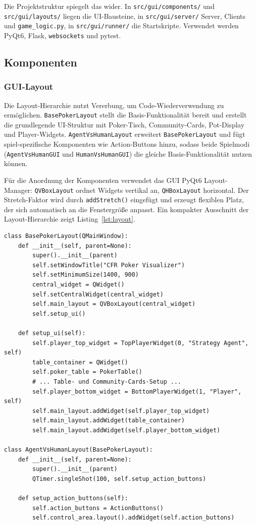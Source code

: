 Die Projektstruktur spiegelt das wider.
In \texttt{src/gui/components/} und \texttt{src/gui/layouts/} liegen die UI-Bausteine, in \texttt{src/gui/server/} Server, Clients und \texttt{game\_logic.py}, in \texttt{src/gui/runner/} die Startskripte.
Verwendet werden PyQt6, Flask, \texttt{websockets} und pytest.

\subsection{Komponenten}

\subsubsection{GUI-Layout}

Die Layout-Hierarchie nutzt Vererbung, um Code-Wiederverwendung zu ermöglichen.
\texttt{BasePokerLayout} stellt die Basis-Funktionalität bereit und erstellt die grundlegende UI-Struktur mit Poker-Tisch, Community-Cards, Pot-Display und Player-Widgets.
\texttt{AgentVsHumanLayout} erweitert \texttt{BasePokerLayout} und fügt spiel-spezifische Komponenten wie Action-Buttons hinzu, sodass beide Spielmodi (\texttt{AgentVsHumanGUI} und \texttt{HumanVsHumanGUI}) die gleiche Basis-Funktionalität nutzen können.

Für die Anordnung der Komponenten verwendet das GUI PyQt6 Layout-Manager: \texttt{QVBoxLayout} ordnet Widgets vertikal an, \texttt{QHBoxLayout} horizontal.
Der Stretch-Faktor wird durch \texttt{addStretch()} eingefügt und erzeugt flexiblen Platz, der sich automatisch an die Fenstergröße anpasst.
Ein kompakter Ausschnitt der Layout-Hierarchie zeigt Listing~\ref{lst:layout}.

\begin{lstlisting}[caption={Layout-Hierarchie (Ausschnitt)}]
class BasePokerLayout(QMainWindow):
    def __init__(self, parent=None):
        super().__init__(parent)
        self.setWindowTitle("CFR Poker Visualizer")
        self.setMinimumSize(1400, 900)
        central_widget = QWidget()
        self.setCentralWidget(central_widget)
        self.main_layout = QVBoxLayout(central_widget)
        self.setup_ui()

    def setup_ui(self):
        self.player_top_widget = TopPlayerWidget(0, "Strategy Agent", self)
        table_container = QWidget()
        self.poker_table = PokerTable()
        # ... Table- und Community-Cards-Setup ...
        self.player_bottom_widget = BottomPlayerWidget(1, "Player", self)
        self.main_layout.addWidget(self.player_top_widget)
        self.main_layout.addWidget(table_container)
        self.main_layout.addWidget(self.player_bottom_widget)

class AgentVsHumanLayout(BasePokerLayout):
    def __init__(self, parent=None):
        super().__init__(parent)
        QTimer.singleShot(100, self.setup_action_buttons)

    def setup_action_buttons(self):
        self.action_buttons = ActionButtons()
        self.control_area.layout().addWidget(self.action_buttons)
\end{lstlisting}\label{lst:layout}

